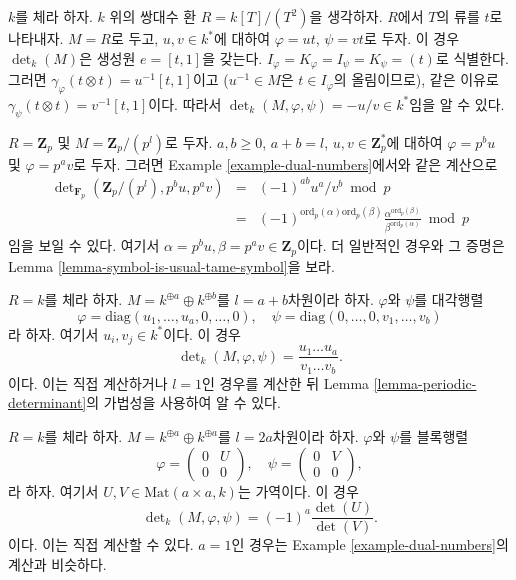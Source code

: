 \begin{example}
\label{example-dual-numbers}
$k$를 체라 하자. $k$ 위의 쌍대수 환 $R = k[T]/(T^2)$을 생각하자.
$R$에서 $T$의 류를 $t$로 나타내자. $M = R$로 두고,
$u, v \in k^*$에 대하여 $\varphi = ut$, $\psi = vt$로 두자. 이 경우
$\det_k(M)$은 생성원 $e = [t, 1]$을 갖는다.
$I_\varphi = K_\varphi = I_\psi = K_\psi = (t)$로 식별한다. 그러면
$\gamma_\varphi(t \otimes t) = u^{-1}[t, 1]$이고
($u^{-1} \in M$은 $t \in I_\varphi$의 올림이므로), 같은 이유로
$\gamma_\psi(t \otimes t) = v^{-1}[t, 1]$이다. 따라서
$\det_k(M, \varphi, \psi) = -u/v \in k^*$임을 알 수 있다.
\end{example}

\begin{example}
\label{example-Zp}
$R = \mathbf{Z}_p$ 및 $M = \mathbf{Z}_p/(p^l)$로 두자.
$a, b \geq 0$, $a + b = l$, $u, v \in \mathbf{Z}_p^*$에 대하여
$\varphi = p^b u$ 및 $\varphi = p^a v$로 두자. 그러면 Example
\ref{example-dual-numbers}에서와 같은 계산으로
\begin{eqnarray*}
\det\nolimits_{\mathbf{F}_p}(\mathbf{Z}_p/(p^l), p^bu, p^av) & = &
(-1)^{ab}u^a/v^b \bmod p \\
& = &
(-1)^{\text{ord}_p(\alpha)\text{ord}_p(\beta)}
\frac{\alpha^{\text{ord}_p(\beta)}}{\beta^{\text{ord}_p(\alpha)}} \bmod p
\end{eqnarray*}
임을 보일 수 있다. 여기서
$\alpha = p^bu, \beta = p^av \in \mathbf{Z}_p$이다. 더 일반적인 경우와
그 증명은 Lemma \ref{lemma-symbol-is-usual-tame-symbol}을 보라.
\end{example}

\begin{example}
\label{example-generic-vector-space}
$R = k$를 체라 하자. $M = k^{\oplus a} \oplus k^{\oplus b}$를
$l = a + b$차원이라 하자. $\varphi$와 $\psi$를 대각행렬
$$
\varphi = \text{diag}(u_1, \ldots, u_a, 0, \ldots, 0),
\quad
\psi = \text{diag}(0, \ldots, 0, v_1, \ldots, v_b)
$$
라 하자. 여기서 $u_i, v_j \in k^*$이다. 이 경우
$$
\det\nolimits_k(M, \varphi, \psi)
=
\frac{u_1 \ldots u_a}{v_1 \ldots v_b}.
$$
이다. 이는 직접 계산하거나 $l = 1$인 경우를 계산한 뒤 Lemma
\ref{lemma-periodic-determinant}의 가법성을 사용하여 알 수 있다.
\end{example}

\begin{example}
\label{example-special-vector-space}
$R = k$를 체라 하자. $M = k^{\oplus a} \oplus k^{\oplus a}$를
$l = 2a$차원이라 하자. $\varphi$와 $\psi$를 블록행렬
$$
\varphi =
\left(
\begin{matrix}
0 & U \\
0 & 0
\end{matrix}
\right),
\quad
\psi =
\left(
\begin{matrix}
0 & V \\
0 & 0
\end{matrix}
\right),
$$
라 하자. 여기서 $U, V \in \text{Mat}(a \times a, k)$는 가역이다.
이 경우
$$
\det\nolimits_k(M, \varphi, \psi)
=
(-1)^a\frac{\det(U)}{\det(V)}.
$$
이다. 이는 직접 계산할 수 있다. $a = 1$인 경우는 Example
\ref{example-dual-numbers}의 계산과 비슷하다.
\end{example}

